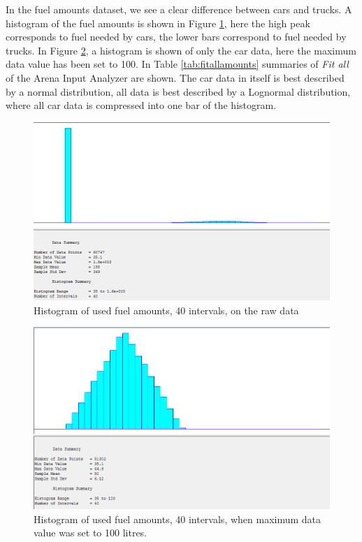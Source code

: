 In the fuel amounts dataset, we see a clear difference between cars and trucks.
A histogram of the fuel amounts is shown in Figure \ref{fig:histogram-amounts-unfiltered}, here the high peak corresponds to fuel needed by cars, the lower bars correspond to fuel needed by trucks.
In Figure \ref{fig:histogram-amounts-filtered}, a histogram is shown of only the car data, here the maximum data value has been set to 100.
In Table \ref{tab:fitallamounts} summaries of \textit{Fit all} of the Arena Input Analyzer are shown.
The car data in itself is best described by a normal distribution, all data is best described by a Lognormal distribution, where all car data is compressed into one bar of the histogram.

\begin{figure}[h]
	\includegraphics[width=\textwidth]{images/histogram-amounts-unfiltered.PNG}
	\caption{Histogram of used fuel amounts, 40 intervals, on the raw data}
	\label{fig:histogram-amounts-unfiltered}
\end{figure}

\begin{figure}[h]
	\includegraphics[width=\textwidth]{images/histogram-amounts-filtered.PNG}
	\caption{Histogram of used fuel amounts, 40 intervals, when maximum data value was set to 100 litres.}
	\label{fig:histogram-amounts-filtered}
\end{figure}

